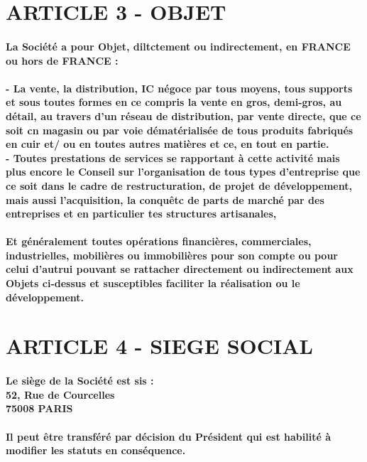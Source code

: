 \documentclass[a4paper, 11pt]{article}
\begin{document}
\section*{ARTICLE 3 - OBJET}

\paragraph{
  La Société a pour Objet, diltctement ou indirectement, en FRANCE ou hors de FRANCE :
}

\paragraph{
  - La vente, la distribution, IC négoce par tous moyens, tous supports et sous toutes formes en ce compris la vente en gros, demi-gros, au détail, au travers d'un réseau de distribution, par vente directe, que ce soit cn magasin ou par voie dématérialisée de tous produits fabriqués en cuir et/ ou en toutes autres matières et ce, en tout en partie.\\
  - Toutes prestations de services se rapportant à cette activité mais plus encore le Conseil sur l'organisation de tous types d'entreprise que ce soit dans le cadre de restructuration, de projet de développement, mais aussi l'acquisition, la conquêtc de parts de marché par des entreprises et en particulier tes structures artisanales,
}

\paragraph{
  Et généralement toutes opérations financières, commerciales, industrielles, mobilières ou immobilières pour son compte ou pour celui d'autrui pouvant se rattacher directement ou indirectement aux Objets ci-dessus et susceptibles faciliter la réalisation ou le développement.
}
\section*{ARTICLE 4 - SIEGE SOCIAL}

\paragraph{
  Le siège de la Société est sis :\\
  52, Rue de Courcelles\\
  75008 PARIS\\
}

\paragraph{
  Il peut être transféré par décision du Président qui est habilité à modifier les statuts en conséquence.
}
\end{document}
